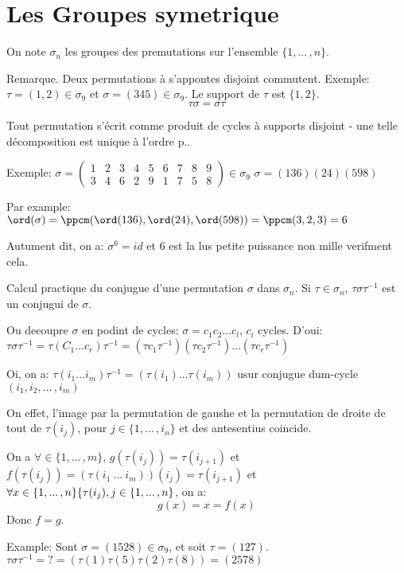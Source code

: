 \section{Les Groupes symetrique} %

On note $\sigma_n$ les groupes des premutations sur l'ensemble $\{1, ...\,, n\}$.

Remarque. Deux permutations à s'appontes disjoint commutent.
Exemple: $\tau=(1, 2)\in \sigma_9$ et $\sigma=(345) \in \sigma_9$.
Le support de $\tau$ est $\{1,2\}$. 
$$\tau\sigma =\sigma \tau$$

\begin{theorem}
	Tout permutation s'écrit comme produit de cycles à supports disjoint - une telle décomposition est unique à l'ordre p..
\end{theorem}

Exemple: $\sigma = \left(\begin{array}{ccccccccc}1&2&3&4&5&6&7&8&9\\3&4&6&2&9&1&7&5&8\end{array}\right)\in\sigma_9$
$\sigma=(136)(24)(598)$

Par example: $\ord(\sigma)=\ppcm(\ord(136), \ord(24), \ord(598))=\ppcm(3,2,3)=6$

Autument dit, on a: $\sigma^6=id$ et 6 est la lus petite puissance non mille verifment cela.

Calcul practique du conjugue d'une permutation $\sigma$ dans $\sigma_n$. Si $\tau\in\sigma_n$, $\tau\sigma\tau^{-1}$ est un conjugui de $\sigma$.

Ou deeoupre $\sigma$ en podint de cycles: $\sigma=c_1 c_2...c_l$, $c_i$ cycles.
D'oui: $\tau\sigma\tau^{-1} =\tau(C_1...c_r)\tau^{-1}=(\tau c_1\tau^{-1})(\tau c_2\tau^{-1})...(\tau c_r\tau^{-1})$

Oi, on a: $\tau(i_1...i_m)\tau^{-1}=(\tau(i_1)...\tau(i_m))$ usur conjugue dum-cycle $(i_1, i_2, ...\,, i_m)$

On effet, l'image par la permutation de gaushe et la permutation de droite de tout de $\tau(i_j)$, pour $j\in\{1,...\,,i_n\}$ et des antesentius coincide.

On a $\forall\in\{1,...\,,m\}$, $g(\tau(i_j))=\tau(i_{j+1})$ et $f(\tau(i_j))=(\tau(i_1\ ...\ i_m))(i_j)=\tau(i_{j+1})$
et $\forall x\in \{ 1,...\,,n\}\\ \{\tau(i_j), j\in\{1,...\,,n\}$, on a:
$$g(x)=x=f(x)$$
Donc $f=g$.

Example:
Sont $\sigma=(1528)\in\sigma_9$, et soit $\tau=(127)$.
$\tau\sigma\tau^{-1}=?= (\tau(1)\tau(5)\tau(2)\tau(8))=(2578)$

